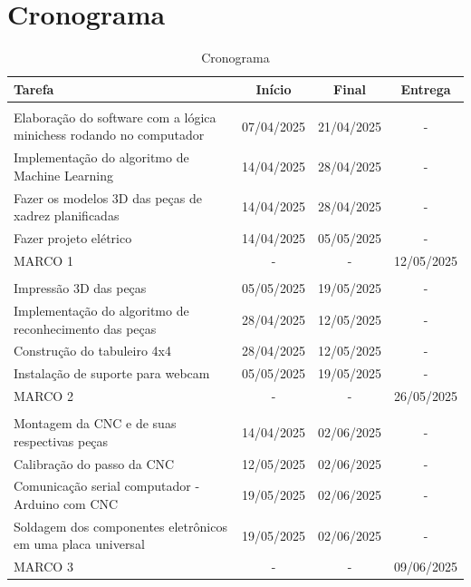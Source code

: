 \documentclass[a4paper,12pt]{article}
\begin{document}
\section{Cronograma}  

\begin{table}[H]
\centering
\caption{Cronograma}
\label{tab:cronograma}
\renewcommand{\arraystretch}{1.5}
\begin{tabularx}{\textwidth}{Yccc}
\toprule
{}
\textbf{Tarefa} & \textbf{Início} & \textbf{Final} & \textbf{Entrega} \\
\midrule

 \\
Elaboração do software com a lógica minichess rodando no computador & 07/04/2025 & 21/04/2025 & - \\
Implementação do algoritmo de Machine Learning & 14/04/2025 & 28/04/2025 & - \\
Fazer os modelos 3D das peças de xadrez planificadas & 14/04/2025 & 28/04/2025 & - \\
Fazer projeto elétrico & 14/04/2025 & 05/05/2025 & - \\
MARCO 1 & - & - & 12/05/2025 \\

 \\
Impressão 3D das peças & 05/05/2025 & 19/05/2025 & - \\
Implementação do algoritmo de reconhecimento das peças & 28/04/2025 & 12/05/2025 & - \\
Construção do tabuleiro 4x4 & 28/04/2025 & 12/05/2025 & - \\
Instalação de suporte para webcam & 05/05/2025 & 19/05/2025 & - \\
MARCO 2 & - & - & 26/05/2025 \\

 \\
Montagem da CNC e de suas respectivas peças & 14/04/2025 & 02/06/2025 & - \\
Calibração do passo da CNC & 12/05/2025 & 02/06/2025 & - \\
Comunicação serial computador - Arduino com CNC & 19/05/2025 & 02/06/2025 & - \\
Soldagem dos componentes eletrônicos em uma placa universal & 19/05/2025 & 02/06/2025 & - \\
MARCO 3 & - & - & 09/06/2025 \\

\bottomrule
\end{tabularx}

\end{table}
\end{document}
